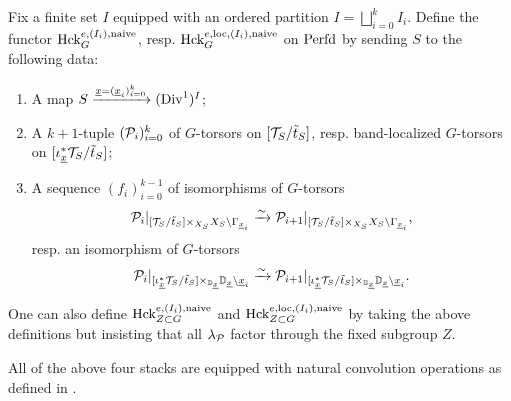 \begin{defi}\label{defi:hcknaive}
    Fix a finite set $I$ equipped with an ordered partition $I = \bigsqcup_{i=0}^{k} I_{i}$.
Define the functor $\textnormal{Hck}_{G}^{e,(I_{i}),\textnormal{naive}}$, resp. $\textnormal{Hck}_{G}^{e,\textnormal{loc},(I_{i}),\textnormal{naive}}$ on $\mathrm{Perfd}$ by sending $S$ to the following data:
\begin{enumerate}
\item{A map $S \xrightarrow{\underline{x} = (\underline{x}_{i})_{i=0}^{k}}(\mathrm{Div}^{1})^{I}$;}
\item{A $k+1$-tuple $(\mathcal{P}_{i})_{i=0}^{k}$ of $G$-torsors on $[\mathcal{T}_{S}/\tilde{t}_{S}]$, resp. band-localized $G$-torsors on $[\iota_{\underline{x}}^{*}\mathcal{T}_{S}/\tilde{t}_{S}]$;}
\item{A sequence $(f_{i})_{i=0}^{k-1}$ of isomorphisms of $G$-torsors
\begin{equation*}
    \mathcal{P}_{i}|_{[\mathcal{T}_{S}/\tilde{t}_{S}] \times_{X_{S}} X_{S} \setminus \Gamma_{\underline{x}_{i}}} \xrightarrow{\sim} \mathcal{P}_{i+1}|_{[\mathcal{T}_{S}/\tilde{t}_{S}] \times_{X_{S}} X_{S} \setminus \Gamma_{\underline{x}_{i}}},
\end{equation*}
resp. an isomorphism of $G$-torsors
\begin{equation*}
    \mathcal{P}_{i}|_{[\iota_{\underline{x}}^{*}\mathcal{T}_{S}/\tilde{t}_{S}] \times_{\mathbb D_{\underline{x}}} \mathbb D_{\underline{x}} \setminus \underline{x}_{i}} \xrightarrow{\sim} \mathcal{P}_{i+1}|_{[\iota_{\underline{x}}^{*}\mathcal{T}_{S}/\tilde{t}_{S}] \times_{\mathbb D_{\underline{x}}} \mathbb D_{\underline{x}} \setminus \underline{x}_{i}}.
\end{equation*}
}
\end{enumerate}
One can also define $\textnormal{Hck}_{Z \subset G}^{e,(I_{i}),\textnormal{naive}}$ and $\textnormal{Hck}_{Z \subset G}^{e,\textnormal{loc},(I_{i}),\textnormal{naive}}$ by taking the above definitions but insisting that all $\lambda_{\mathcal{P}}$ factor through the fixed subgroup $Z$.
\end{defi}
All of the above four stacks are equipped with natural convolution operations as defined in \cite[\S VI.8]{Geometrization}. 

